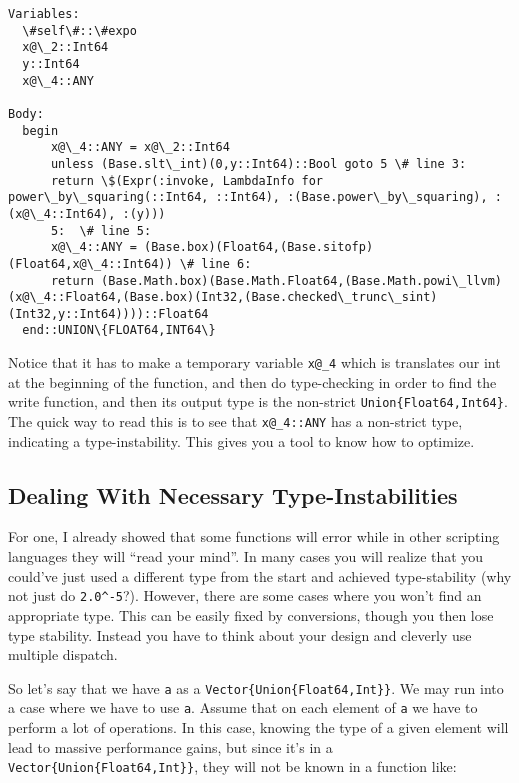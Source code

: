 \documentclass[11pt]{article}
\begin{document}
    \begin{Verbatim}[commandchars=\\\{\}]
Variables:
  \#self\#::\#expo
  x@\_2::Int64
  y::Int64
  x@\_4::ANY

Body:
  begin 
      x@\_4::ANY = x@\_2::Int64
      unless (Base.slt\_int)(0,y::Int64)::Bool goto 5 \# line 3:
      return \$(Expr(:invoke, LambdaInfo for power\_by\_squaring(::Int64, ::Int64), :(Base.power\_by\_squaring), :(x@\_4::Int64), :(y)))
      5:  \# line 5:
      x@\_4::ANY = (Base.box)(Float64,(Base.sitofp)(Float64,x@\_4::Int64)) \# line 6:
      return (Base.Math.box)(Base.Math.Float64,(Base.Math.powi\_llvm)(x@\_4::Float64,(Base.box)(Int32,(Base.checked\_trunc\_sint)(Int32,y::Int64))))::Float64
  end::UNION\{FLOAT64,INT64\}

    \end{Verbatim}

    Notice that it has to make a temporary variable \texttt{x@\_4} which is
translates our int at the beginning of the function, and then do
type-checking in order to find the write function, and then its output
type is the non-strict \texttt{Union\{Float64,Int64\}}. The quick way to
read this is to see that \texttt{x@\_4::ANY} has a non-strict type,
indicating a type-instability. This gives you a tool to know how to
optimize.

    \subsection{Dealing With Necessary
Type-Instabilities}\label{dealing-with-necessary-type-instabilities}

For one, I already showed that some functions will error while in other
scripting languages they will ``read your mind''. In many cases you will
realize that you could've just used a different type from the start and
achieved type-stability (why not just do \texttt{2.0\^{}-5}?). However,
there are some cases where you won't find an appropriate type. This can
be easily fixed by conversions, though you then lose type stability.
Instead you have to think about your design and cleverly use multiple
dispatch.

So let's say that we have \texttt{a} as a
\texttt{Vector\{Union\{Float64,Int\}\}}. We may run into a case where we
have to use \texttt{a}. Assume that on each element of \texttt{a} we
have to perform a lot of operations. In this case, knowing the type of a
given element will lead to massive performance gains, but since it's in
a \texttt{Vector\{Union\{Float64,Int\}\}}, they will not be known in a
function like:
\end{document}
